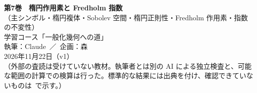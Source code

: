 
\usepackage{tikz}
\usepackage{tikz-cd}
\usetikzlibrary{arrows.meta,positioning,calc}
\setlength{\headheight}{14pt}
\newcommand{\Oc}{\mathcal O}
\newcommand{\Ker}{\operatorname{Ker}}
\newcommand{\Coker}{\operatorname{Coker}}
\newcommand{\Ran}{\operatorname{Ran}}
\newcommand{\Diff}{\mathrm{Diff}}
\newcommand{\Op}{\operatorname{Op}}
\newcommand{\jb}[1]{\langle #1\rangle}
\newcommand{\T}{\mathbb T}
\newcommand{\ft}[1]{\widehat{#1}}
\newcommand{\nrm}[2]{\lVert #1\rVert_{#2}}
\newcommand{\ip}[2]{\langle #1,#2\rangle}
\newcommand{\sym}{\sigma}
\newcommand{\CP}{\mathbb{CP}}
\newcommand{\vol}{\mathrm{vol}}
\renewcommand{\Re}{\operatorname{Re}}
\renewcommand{\Im}{\operatorname{Im}}
\renewcommand{\contentsname}{目次}\renewcommand{\figurename}{図}
\usepackage{fontspec}\newfontfamily{}

\sloppy
\begin{center}
{\LARGE\bfseries\sffamily 第7巻　楕円作用素と Fredholm 指数}\\[4pt]
{\large\sffamily （主シンボル・楕円複体・Sobolev 空間・楕円正則性・Fredholm 作用素・指数の不変性）}\\[8pt]
{\large 学習コース「一般化幾何への道」}\\[6pt]
{\large 執筆：Claude\ ／\ 企画：森}\\[3pt]
2026年11月22日（v1）\\[3pt]
{\small （外部の査読は受けていない教材。執筆者とは別の AI による独立検査と、可能な範囲の計算での検算は行った。標準的な結果には出典を付け、確認できていないものは\tQ\ で示す。）}
\end{center}

